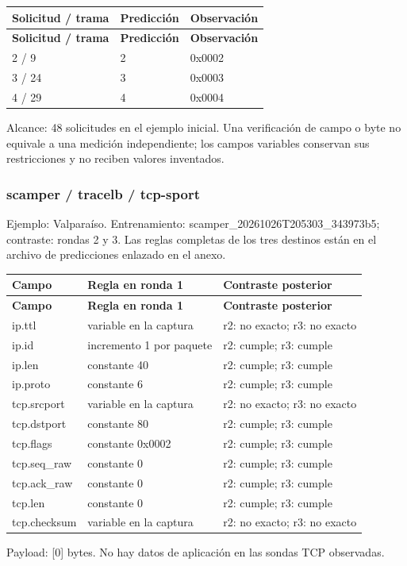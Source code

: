 \begingroup
\fontsize{9}{11}\selectfont
\addtocounter{table}{-1}
\begin{longtable}{p{3.2cm}p{5.1cm}p{5.1cm}}
\toprule
\textbf{Solicitud / trama} & \textbf{Predicción} & \textbf{Observación} \\ \midrule
\endfirsthead
\toprule
\textbf{Solicitud / trama} & \textbf{Predicción} & \textbf{Observación} \\ \midrule
\endhead
2 / 9 & 2 & 0x0002 \\
3 / 24 & 3 & 0x0003 \\
4 / 29 & 4 & 0x0004 \\
\bottomrule
\end{longtable}
\endgroup
Alcance: 48 solicitudes en el ejemplo inicial. Una verificación de campo o byte no equivale a una medición independiente; los campos variables conservan sus restricciones y no reciben valores inventados.

\subsubsection{scamper / tracelb / tcp-sport}
Ejemplo: Valparaíso. Entrenamiento: scamper\_\allowbreak{}20261026T205303\_\allowbreak{}343973b5; contraste: rondas 2 y 3. Las reglas completas de los tres destinos están en el archivo de predicciones enlazado en el anexo.

\begingroup
\fontsize{9}{11}\selectfont
\addtocounter{table}{-1}
\begin{longtable}{p{3.1cm}p{5.8cm}p{5.1cm}}
\toprule
\textbf{Campo} & \textbf{Regla en ronda 1} & \textbf{Contraste posterior} \\ \midrule
\endfirsthead
\toprule
\textbf{Campo} & \textbf{Regla en ronda 1} & \textbf{Contraste posterior} \\ \midrule
\endhead
ip.ttl & variable en la captura & r2: no exacto; r3: no exacto \\
ip.id & incremento 1 por paquete & r2: cumple; r3: cumple \\
ip.len & constante 40 & r2: cumple; r3: cumple \\
ip.proto & constante 6 & r2: cumple; r3: cumple \\
tcp.srcport & variable en la captura & r2: no exacto; r3: no exacto \\
tcp.dstport & constante 80 & r2: cumple; r3: cumple \\
tcp.flags & constante 0x0002 & r2: cumple; r3: cumple \\
tcp.seq\_\allowbreak{}raw & constante 0 & r2: cumple; r3: cumple \\
tcp.ack\_\allowbreak{}raw & constante 0 & r2: cumple; r3: cumple \\
tcp.len & constante 0 & r2: cumple; r3: cumple \\
tcp.checksum & variable en la captura & r2: no exacto; r3: no exacto \\
\bottomrule
\end{longtable}
\endgroup
Payload: [0] bytes. No hay datos de aplicación en las sondas TCP observadas.

